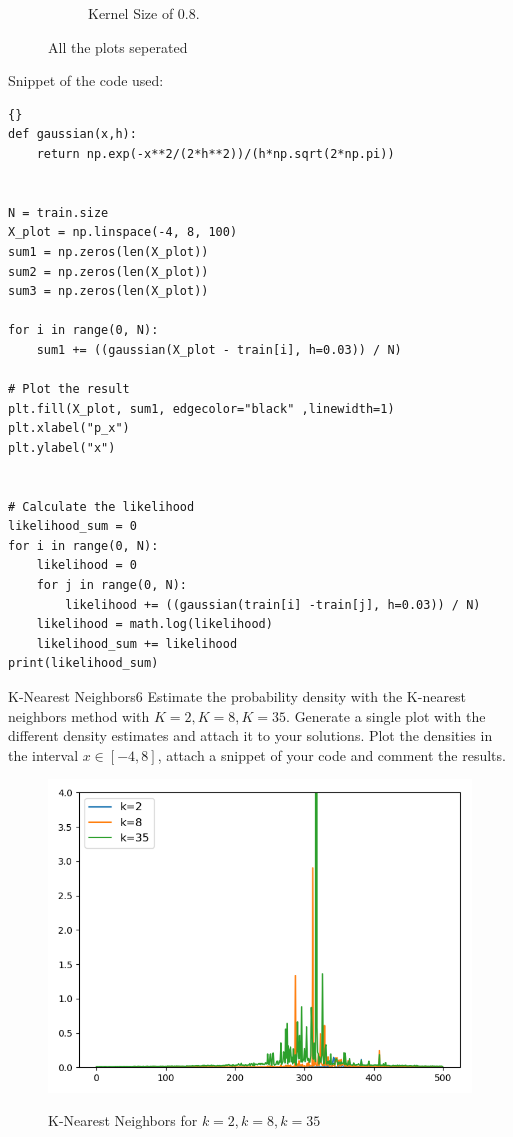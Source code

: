 \begin{questions}
\begin{figure}[H]
\begin{subfigure}[b]{0.3\linewidth}
	\caption{Kernel Size of 0.8.}
	\label{fig:kd03}
\end{subfigure}
	\caption{All the plots seperated}
\end{figure}


Snippet of the code used: 
\begin{lstlisting}{}
def gaussian(x,h):
    return np.exp(-x**2/(2*h**2))/(h*np.sqrt(2*np.pi))  


N = train.size
X_plot = np.linspace(-4, 8, 100)
sum1 = np.zeros(len(X_plot))
sum2 = np.zeros(len(X_plot))
sum3 = np.zeros(len(X_plot))

for i in range(0, N):
    sum1 += ((gaussian(X_plot - train[i], h=0.03)) / N)

# Plot the result
plt.fill(X_plot, sum1, edgecolor="black" ,linewidth=1)
plt.xlabel("p_x")
plt.ylabel("x")


# Calculate the likelihood
likelihood_sum = 0
for i in range(0, N):
    likelihood = 0
    for j in range(0, N):
        likelihood += ((gaussian(train[i] -train[j], h=0.03)) / N)
    likelihood = math.log(likelihood)
    likelihood_sum += likelihood
print(likelihood_sum)
\end{lstlisting}


\begin{question}{K-Nearest Neighbors}{6}
Estimate the probability density with the K-nearest neighbors method with $K=2, K=8, K=35$.
Generate a single plot with the different density estimates and attach it to your solutions. Plot the densities in the interval $x \in [-4,8]$, attach a snippet of your code and comment the results.

\begin{answer}\end{answer}

\end{question}

\begin{figure}[!h]
	\includegraphics[width=0.7\linewidth]{pictures/knnplot.png}
	\centering
	\label{kd}
	\caption{K-Nearest Neighbors for $k=2, k=8, k=35$}
\end{figure}


\end{questions}
